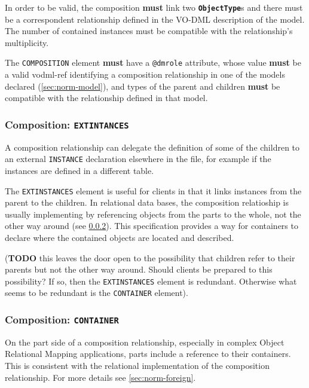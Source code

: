 \documentclass[11pt,a4paper]{ivoa}
\begin{document}
In order to be valid, the composition \textbf{must} link two
\textbf{\texttt{ObjectType}}s and there must be a correspondent
relationship defined in the VO-DML description of the model. The number
of contained instances must be compatible with the relationship's
multiplicity.

The \texttt{COMPOSITION} element \textbf{must} have a \texttt{@dmrole}
attribute, whose value \textbf{must} be a valid vodml-ref identifying a
composition relationship in one of the models declared
(\ref{sec:norm-model}), and types of the parent and children
\textbf{must} be compatible with the relationship defined in that model.

\subsubsection{Composition:
\texttt{EXTINTANCES}}\label{sec:norm-extinstances}

A composition relationship can delegate the definition of some of the
children to an external \texttt{INSTANCE} declaration elsewhere in the
file, for example if the instances are defined in a different table.

The \texttt{EXTINSTANCES} element is useful for clients in that it links
instances from the parent to the children. In relational data bases, the
composition relatioship is usually implementing by referencing objects
from the parts to the whole, not the other way around (see
\ref{sec:norm-container}). This specification provides a way for
containers to declare where the contained objects are located and
described.

(\textbf{TODO} this leaves the door open to the possibility that
children refer to their parents but not the other way around. Should
clients be prepared to this possibility? If so, then the
\texttt{EXTINSTANCES} element is redundant. Otherwise what seems to be
redundant is the \texttt{CONTAINER} element).

\subsubsection{Composition:
\texttt{CONTAINER}}\label{sec:norm-container}

On the part side of a composition relationship, especially in complex
Object Relational Mapping applications, parts include a reference to
their containers. This is consistent with the relational implementation
of the composition relationship. For more details see
\ref{sec:norm-foreign}.
\end{document}
